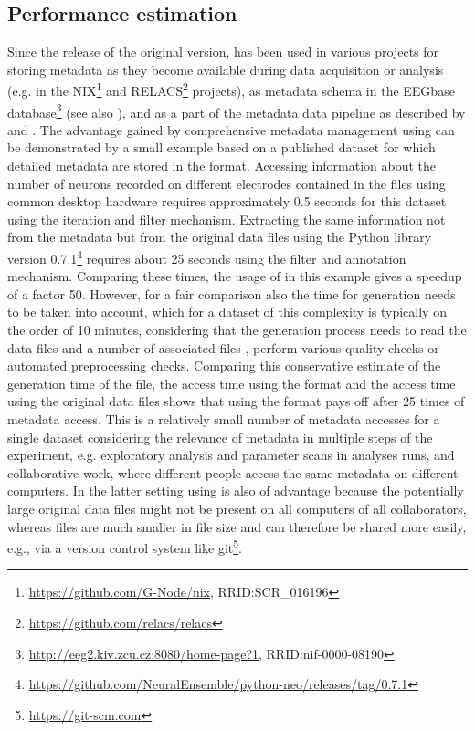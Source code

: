 \subsection{Performance estimation}
Since the release of the original version,  has been used in various projects for storing metadata as they become available during data acquisition or analysis (e.g. in the NIX\footnote{\url{https://github.com/G-Node/nix}, RRID:SCR\_016196} and RELACS\footnote{\url{https://github.com/relacs/relacs}} projects), as metadata schema in the EEGbase database\footnote{\url{http://eeg2.kiv.zcu.cz:8080/home-page?1}, RRID:nif-0000-08190} (see also \citealp{Moucek_2014}), and as a part of the metadata data pipeline as described by \cite{Zehl_2016} and \cite{Brochier_2018}. The advantage gained by comprehensive metadata management using  can be demonstrated by a small example based on a published dataset \citep{Brochier_2018} for which detailed metadata are stored in the  format. Accessing information about the number of neurons recorded on different electrodes contained in the  files using common desktop hardware requires approximately 0.5 seconds for this dataset using the  iteration and filter mechanism. Extracting the same information not from the  metadata but from the original data files using the Python library  version 0.7.1\footnote{\url{https://github.com/NeuralEnsemble/python-neo/releases/tag/0.7.1}} requires about 25 seconds using the  filter and annotation mechanism. Comparing these times, the usage of  in this example gives a speedup of a factor 50. However, for a fair comparison also the time for  generation needs to be taken into account, which for a dataset of this complexity is typically on the order of 10 minutes, considering that the generation process needs to read the data files and a number of associated files \citep{Zehl_2016}, perform various quality checks or automated preprocessing checks. Comparing this conservative estimate of the generation time of the  file, the access time using the  format and the access time using the original data files shows that using the  format pays off after 25 times of metadata access. This is a relatively small number of metadata accesses for a single dataset considering the relevance of metadata in multiple steps of the experiment, e.g. exploratory analysis and parameter scans in analyses runs, and collaborative work, where different people access the same metadata on different computers. In the latter setting using  is also of advantage because the potentially large original data files might not be present on all computers of all collaborators, whereas  files are much smaller in file size and can therefore be shared more easily, e.g., via a version control system like git\footnote{\url{https://git-scm.com}}.

